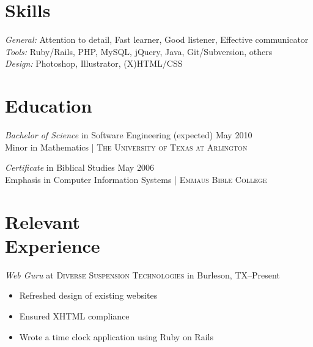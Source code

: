 \documentclass[margin]{res}
\begin{document}
\begin{resume}

\section{\textsf{Skills}}

                \textit{General:} Attention to detail, Fast learner, Good listener, Effective communicator  \\
                \textit{Tools:} Ruby/Rails, PHP, MySQL, jQuery, Java, Git/Subversion, others                \\
                \textit{Design:} Photoshop, Illustrator, (X)HTML/CSS                                       %


\section{\textsf{Education}}

                \textit{Bachelor of Science} in Software Engineering \dotfill (expected) May 2010   \\
								Minor in Mathematics \hfill | \textsc{The University of Texas at Arlington}                                                                
								                
                \textit{Certificate} in Biblical Studies \dotfill May 2006  \\
                Emphasis in Computer Information Systems \hfill | \textsc{Emmaus Bible College}                    



\section{\textsf{Relevant \\ Experience}} 
                
                \textit{Web Guru}
                 at \textsc{Diverse Suspension Technologies} in Burleson, TX--Present
                 \begin{itemize} \itemsep -2pt %
                   \item Refreshed design of existing websites
                   \item Ensured XHTML compliance
                   \item Wrote a time clock application using Ruby on Rails
                \end{itemize}
                

\end{resume}
\end{document}
